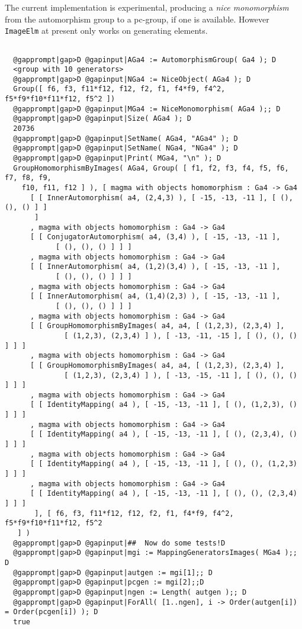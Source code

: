 \documentclass[a4paper,11pt]{report}
\begin{document}
{{{ The current implementation is experimental, producing a \emph{nice monomorphism} from the automorphism group to a pc-group, if one is available. However \texttt{ImageElm} at present only works on generating elements. 

 }

 
\begin{Verbatim}[commandchars=@|D,fontsize=\small,frame=single,label=Example]
  
  @gapprompt|gap>D @gapinput|AGa4 := AutomorphismGroup( Ga4 ); D
  <group with 10 generators>
  @gapprompt|gap>D @gapinput|NGa4 := NiceObject( AGa4 ); D
  Group([ f6, f3, f11*f12, f12, f2, f1, f4*f9, f4^2, f5*f9*f10*f11*f12, f5^2 ])
  @gapprompt|gap>D @gapinput|MGa4 := NiceMonomorphism( AGa4 );; D
  @gapprompt|gap>D @gapinput|Size( AGa4 ); D
  20736
  @gapprompt|gap>D @gapinput|SetName( AGa4, "AGa4" ); D
  @gapprompt|gap>D @gapinput|SetName( NGa4, "NGa4" ); D
  @gapprompt|gap>D @gapinput|Print( MGa4, "\n" ); D
  GroupHomomorphismByImages( AGa4, Group( [ f1, f2, f3, f4, f5, f6, f7, f8, f9, 
    f10, f11, f12 ] ), [ magma with objects homomorphism : Ga4 -> Ga4
      [ [ InnerAutomorphism( a4, (2,4,3) ), [ -15, -13, -11 ], [ (), (), () ] ] 
       ]
      , magma with objects homomorphism : Ga4 -> Ga4
      [ [ ConjugatorAutomorphism( a4, (3,4) ), [ -15, -13, -11 ], 
            [ (), (), () ] ] ]
      , magma with objects homomorphism : Ga4 -> Ga4
      [ [ InnerAutomorphism( a4, (1,2)(3,4) ), [ -15, -13, -11 ], 
            [ (), (), () ] ] ]
      , magma with objects homomorphism : Ga4 -> Ga4
      [ [ InnerAutomorphism( a4, (1,4)(2,3) ), [ -15, -13, -11 ], 
            [ (), (), () ] ] ]
      , magma with objects homomorphism : Ga4 -> Ga4
      [ [ GroupHomomorphismByImages( a4, a4, [ (1,2,3), (2,3,4) ], 
              [ (1,2,3), (2,3,4) ] ), [ -13, -11, -15 ], [ (), (), () ] ] ]
      , magma with objects homomorphism : Ga4 -> Ga4
      [ [ GroupHomomorphismByImages( a4, a4, [ (1,2,3), (2,3,4) ], 
              [ (1,2,3), (2,3,4) ] ), [ -13, -15, -11 ], [ (), (), () ] ] ]
      , magma with objects homomorphism : Ga4 -> Ga4
      [ [ IdentityMapping( a4 ), [ -15, -13, -11 ], [ (), (1,2,3), () ] ] ]
      , magma with objects homomorphism : Ga4 -> Ga4
      [ [ IdentityMapping( a4 ), [ -15, -13, -11 ], [ (), (2,3,4), () ] ] ]
      , magma with objects homomorphism : Ga4 -> Ga4
      [ [ IdentityMapping( a4 ), [ -15, -13, -11 ], [ (), (), (1,2,3) ] ] ]
      , magma with objects homomorphism : Ga4 -> Ga4
      [ [ IdentityMapping( a4 ), [ -15, -13, -11 ], [ (), (), (2,3,4) ] ] ]
       ], [ f6, f3, f11*f12, f12, f2, f1, f4*f9, f4^2, f5*f9*f10*f11*f12, f5^2 
   ] )
  @gapprompt|gap>D @gapinput|##  Now do some tests!D
  @gapprompt|gap>D @gapinput|mgi := MappingGeneratorsImages( MGa4 );; D
  @gapprompt|gap>D @gapinput|autgen := mgi[1];; D
  @gapprompt|gap>D @gapinput|pcgen := mgi[2];;D
  @gapprompt|gap>D @gapinput|ngen := Length( autgen );; D
  @gapprompt|gap>D @gapinput|ForAll( [1..ngen], i -> Order(autgen[i]) = Order(pcgen[i]) ); D
  true 
  

\end{Verbatim}}}
\end{document}
